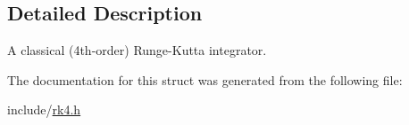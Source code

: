 \subsection{Detailed Description}
A classical (4th-\/order) Runge-\/\+Kutta integrator. 

The documentation for this struct was generated from the following file\+:\begin{DoxyCompactItemize}
\item 
include/\hyperlink{rk4_8h}{rk4.\+h}\end{DoxyCompactItemize}
